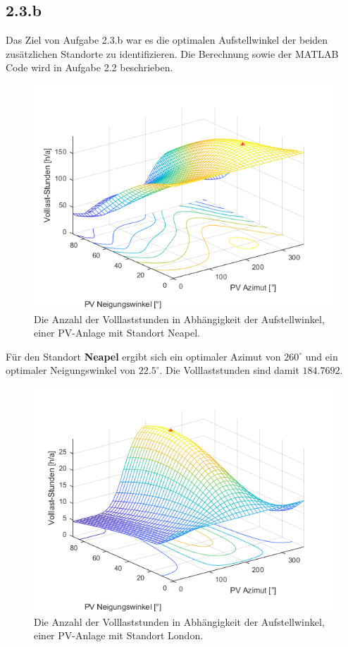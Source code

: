 \documentclass[a4paper,12pt]{article}
\begin{document}
	\subsection{2.3.b}
	Das Ziel von Aufgabe 2.3.b war es die optimalen Aufstellwinkel der beiden zusätzlichen Standorte zu identifizieren.\newline
	Die Berechnung sowie der MATLAB Code wird in Aufgabe 2.2 beschrieben.
	\begin{figure}[H]
		\centering
		\includegraphics[width=12cm]{img/results/VolllaststundenAbhaengigVomWinkelNeapel}
		\caption{Die Anzahl der Volllaststunden in Abhängigkeit der Aufstellwinkel, einer PV-Anlage mit Standort Neapel.}
	\end{figure}
	Für den Standort \textbf{Neapel} ergibt sich ein optimaler Azimut von $260^{\circ}$ und ein optimaler Neigungswinkel von $22.5^{\circ}$. Die Volllaststunden sind damit $184.7692$.
	\begin{figure}[H]
		\centering
		\includegraphics[width=12cm]{img/results/VolllaststundenAbhaengigVomWinkelLondon}
		\caption{Die Anzahl der Volllaststunden in Abhängigkeit der Aufstellwinkel, einer PV-Anlage mit Standort London.}
	\end{figure}
\end{document}
